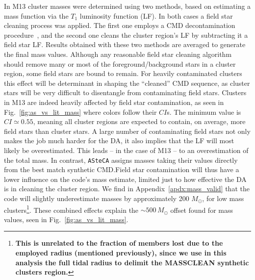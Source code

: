 \documentclass{aa}
\begin{document}
In M13 cluster masses were determined using two methods, based on estimating
a mass function via the $T_1$ luminosity function (LF).
In both cases a field star cleaning process was applied. The first one employs
a CMD decontamination procedure~\citep{Maia_2010}, and the
second one cleans the cluster region's LF by subtracting it a field star LF.\@
Results obtained with these two methods are averaged to generate the final
mass values.
%
Although any reasonable field star cleaning algorithm should remove many or most
of the foreground/background stars in a cluster region, some field stars are
bound to remain. For heavily contaminated clusters this effect will be
determinant in shaping the ``cleaned'' CMD sequence, as cluster stars will be
very difficult to disentangle from contaminating field stars.
%
Clusters in M13 are indeed heavily affected by field star contamination,
as seen in Fig.~\ref{fig:as_vs_lit_mass} where colors follow their $CI$s.
The minimum value is $CI{\simeq}0.55$, meaning all cluster regions are expected
to contain, on average, more field stars than cluster stars.
%
A large number of contaminating field stars not only makes the job much harder
for the DA, it also implies that the LF will most likely be overestimated. This
leads -- in the case of M13 --  to an overestimation of the total mass.
%
In contrast, \texttt{ASteCA} assigns masses taking their values directly from
the best match synthetic CMD.\@ Field star contamination will thus have a lower
influence on the code's mass estimate, limited just to how effective the DA is
in cleaning the cluster region.
%
We find in Appendix~\ref{apdx:mass_valid} that the code will slightly
underestimate masses by approximately 200 $M_{\odot}$, for low mass
clusters\footnote{\textbf{This is unrelated to the fraction of members lost due
to the employed radius (mentioned previously), since we use in this analysis
the full tidal radius to delimit the MASSCLEAN synthetic clusters region.}}.
These combined effects explain the ${\sim}500\,M_{\odot}$ offset found
for mass values, seen in Fig.~\ref{fig:as_vs_lit_mass}.
\end{document}
